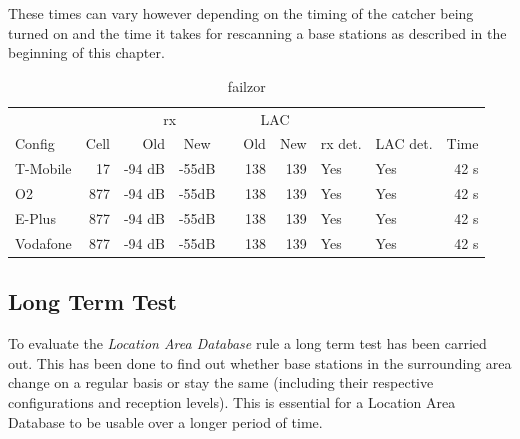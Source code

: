 These times can vary however depending on the timing of the catcher being turned on and the time it takes for rescanning a base stations as described in the beginning of this chapter.
\begin{table}
\centering
\begin{tabular}{lrrcrrrllr}
\toprule
			&				&\multicolumn{2}{c}{rx}		&\phantom{a}	&\multicolumn{2}{c}{LAC}	&				&	&		\\
								\cmidrule{3-4} 								\cmidrule{6-7} 
Config 		&Cell			&Old	&New				&				&Old	&New				&rx det.	&LAC det.		&Time\\
\midrule
T-Mobile	&17				&-94 dB	&-55dB				&				&138	&139				&Yes		&Yes	&42 s\\
O2			&877			&-94 dB	&-55dB				&				&138	&139				&Yes		&Yes	&42 s\\
E-Plus		&877			&-94 dB	&-55dB				&				&138	&139				&Yes		&Yes	&42 s\\
Vodafone	&877			&-94 dB	&-55dB				&				&138	&139				&Yes		&Yes	&42 s\\
\bottomrule
\end{tabular}
\caption{failzor}
\label{tab:par_change}
\end{table}

\subsection{Long Term Test}
To evaluate the \emph{Location Area Database} rule a long term test has been carried out.
This has been done to find out whether base stations in the surrounding area change on a regular basis or stay the same (including their respective configurations and reception levels).
This is essential for a Location Area Database to be usable over a longer period of time.

